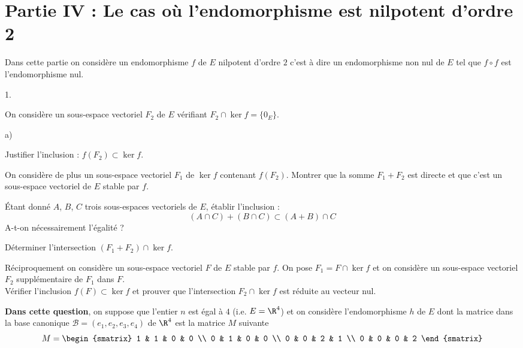 \documentclass[11pt]{article}%
\begin{document}
\section*{Partie IV : {Le cas où l'endomorphisme est nilpotent d'ordre
2}}

Dans cette partie on considère un endomorphisme $f$ de $E$ nilpotent
d'ordre 
$2$ c'est à dire un endomorphisme non nul de $E$ tel que $f\circ f$ est
l'endomorphisme nul.

\begin{noliste}{1.}
 \setlength{\itemsep}{4mm}
\item On considère un sous-espace vectoriel $F_{2}$ de $E$ vérifiant
$F_{2}\cap \ker f = \{0_{E}\}$.

\begin{noliste}{a)}
 \setlength{\itemsep}{2mm}
\item Justifier l'inclusion : $f(F_{2})\subset \ker f$.

\item On considère de plus un sous-espace vectoriel $F_{1}$ de $\ker f$
contenant $f(F_{2})$. Montrer que la somme $F_{1} + F_{2}$ est directe
et que
c'est un sous-espace vectoriel de $E$ stable par $f$.

\item Étant donné $A$, $B$, $C$ trois sous-espaces vectoriels de $E$,
établir l'inclusion : 
\[
(A\cap C) + (B\cap C)\subset (A + B)\cap C
\]
A-t-on nécessairement l'égalité ?

\item Déterminer l'intersection $(F_{1} + F_{2})\cap \ker f$.
\end{noliste}

\item Réciproquement on considère un sous-espace vectoriel $F$ de $E$
stable
par $f$. On pose $F_{1} = F\cap \ker f$ et on considère un sous-espace
vectoriel $F_{2}$ supplémentaire de $F_{1}$ dans $F$.\\
Vérifier l'inclusion $f(F)\subset \ker f$ et prouver que l'intersection
$F_{2}\cap \ker f$ est réduite au vecteur nul.

\item \textbf{Dans cette question}, on suppose que l'entier $n$ est
égal à $4 $ (i.e. $E = \R^{4}$) et on considère l'endomorphisme $h$ de
$E$
dont la matrice dans la base canonique $\mathcal{B} =
(e_{1},e_{2},e_{3},e_{4}) $ de $\R^{4}$ est la matrice $M$ suivante 
\[
M = 
\begin{smatrix}
1 & 1 & 0 & 0 \\
0 & 1 & 0 & 0 \\
0 & 0 & 2 & 1 \\
0 & 0 & 0 & 2
\end{smatrix}
\]


\end{noliste}
\end{document}
